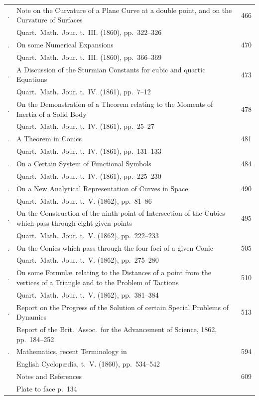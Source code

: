 \documentclass[11pt,a4paper]{book}
\begin{document}
\begin{longtable}{p{0.5in}p{3.8in}p{0.4in}}
\addlinespace
288. & Note on the Curvature of a Plane Curve at a double point, and on the Curvature of Surfaces \dotfill & 466 \\
& \quad Quart.\ Math.\ Jour. t.~III. (1860), pp.~322--326 & \\
\addlinespace
289. & On some Numerical Expansions \dotfill & 470 \\
& \quad Quart.\ Math.\ Jour. t.~III. (1860), pp.~366--369 & \\
\addlinespace
290. & A Discussion of the Sturmian Constants for cubic and quartic Equations \dotfill & 473 \\
& \quad Quart.\ Math.\ Jour. t.~IV. (1861), pp.~7--12 & \\
\addlinespace
291. & On the Demonstration of a Theorem relating to the Moments of Inertia of a Solid Body \dotfill & 478 \\
& \quad Quart.\ Math.\ Jour. t.~IV. (1861), pp.~25--27 & \\
\addlinespace
292. & A Theorem in Conics \dotfill & 481 \\
& \quad Quart.\ Math.\ Jour. t.~IV. (1861), pp.~131--133 & \\
\addlinespace
293. & On a Certain System of Functional Symbols \dotfill & 484 \\
& \quad Quart.\ Math.\ Jour. t.~IV. (1861), pp.~225--230 & \\
\addlinespace
294. & On a New Analytical Representation of Curves in Space \dotfill & 490 \\
& \quad Quart.\ Math.\ Jour. t.~V. (1862), pp.~81--86 & \\
\addlinespace
295. & On the Construction of the ninth point of Intersection of the Cubics which pass through eight given points \dotfill & 495 \\
& \quad Quart.\ Math.\ Jour. t.~V. (1862), pp.~222--233 & \\
\addlinespace
296. & On the Conics which pass through the four foci of a given Conic \dotfill & 505 \\
& \quad Quart.\ Math.\ Jour. t.~V. (1862), pp.~275--280 & \\
\addlinespace
297. & On some Formul\ae\ relating to the Distances of a point from the vertices of a Triangle and to the Problem of Tactions \dotfill & 510 \\
& \quad Quart.\ Math.\ Jour. t.~V. (1862), pp.~381--384 & \\
\addlinespace
298. & Report on the Progress of the Solution of certain Special Problems of Dynamics \dotfill & 513 \\
& \quad Report of the Brit.\ Assoc.\ for the Advancement of Science, 1862, pp.~184--252 & \\
\addlinespace
299. & Mathematics, recent Terminology in \dotfill & 594 \\
& \quad English Cyclop\ae dia, t.~V. (1860), pp.~534--542 & \\
\addlinespace
& Notes and References \dotfill & 609 \\
\addlinespace
& Plate to face p.~134 & \\
\end{longtable}
\newpage
\end{document}
